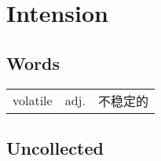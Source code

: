 \section{Intension}

\subsection{Words}

\begin{tabular}{lll}
    volatile & adj. & 不稳定的 \\
\end{tabular}

\subsection{Uncollected}

